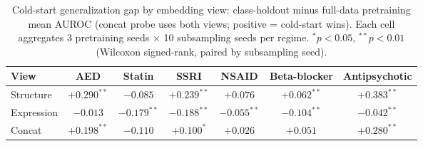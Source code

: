 \begin{table}[t]
\caption{Cold-start generalization gap by embedding view: class-holdout minus full-data pretraining mean AUROC (concat probe uses both views; positive = cold-start wins). Each cell aggregates 3 pretraining seeds $\times$ 10 subsampling seeds per regime. $^{*}p{<}0.05$, $^{**}p{<}0.01$ (Wilcoxon signed-rank, paired by subsampling seed).}
\label{tab:perview}
\begin{center}\small
\begin{tabular}{lcccccc}
\toprule
View & AED & Statin & SSRI & NSAID & Beta-blocker & Antipsychotic \\
\midrule
Structure & $+0.290^{**}$ & $-0.085$ & $+0.239^{**}$ & $+0.076$ & $+0.062^{**}$ & $+0.383^{**}$ \\
Expression & $-0.013$ & $-0.179^{**}$ & $-0.188^{**}$ & $-0.055^{**}$ & $-0.104^{**}$ & $-0.042^{**}$ \\
Concat & $+0.198^{**}$ & $-0.110$ & $+0.100^{*}$ & $+0.026$ & $+0.051$ & $+0.280^{**}$ \\
\bottomrule
\end{tabular}\end{center}\end{table}